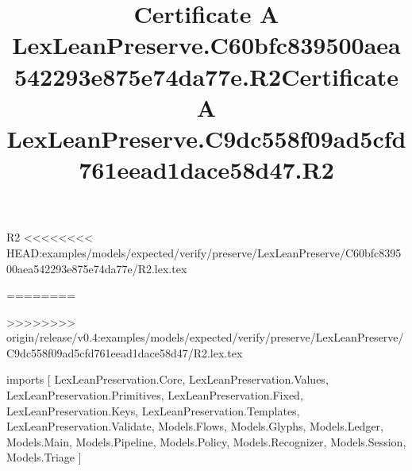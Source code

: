 \begin{lexlean}{R2}
<<<<<<<< HEAD:examples/models/expected/verify/preserve/LexLeanPreserve/C60bfc839500aea542293e875e74da77e/R2.lex.tex
\title{Certificate A LexLeanPreserve.C60bfc839500aea542293e875e74da77e.R2}
========
\title{Certificate A LexLeanPreserve.C9dc558f09ad5cfd761eead1dace58d47.R2}
>>>>>>>> origin/release/v0.4:examples/models/expected/verify/preserve/LexLeanPreserve/C9dc558f09ad5cfd761eead1dace58d47/R2.lex.tex
\begin{coremodule}
imports [
  LexLeanPreservation.Core,
  LexLeanPreservation.Values,
  LexLeanPreservation.Primitives,
  LexLeanPreservation.Fixed,
  LexLeanPreservation.Keys,
  LexLeanPreservation.Templates,
  LexLeanPreservation.Validate,
  Models.Flows,
  Models.Glyphs,
  Models.Ledger,
  Models.Main,
  Models.Pipeline,
  Models.Policy,
  Models.Recognizer,
  Models.Session,
  Models.Triage
]


\end{coremodule}
\end{lexlean}
